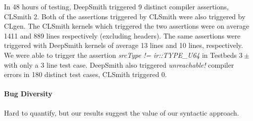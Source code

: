 In 48 hours of testing, DeepSmith triggered 9 distinct compiler assertions, CLSmith 2. Both of the assertions triggered by CLSmith were also triggered by CLgen.
%
%
%
The CLSmith kernels which triggered the two assertions were on average 1411 and 889 lines respectively (excluding headers). The same assertions were triggered with DeepSmith kernels of average 13 lines and 10 lines, respectively. 
%
We were able to trigger the assertion \emph{srcType != ir::TYPE\_U64} in Testbeds $3\pm$ with only a 3 line test case.
%
DeepSmith also triggered \emph{unreachable!} compiler errors in 180 distinct test cases, CLSmith triggered 0.



\paragraph{Bug Diversity}

Hard to quantify, but our results suggest the value of our syntactic approach.

